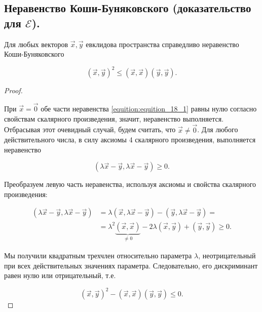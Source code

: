 \subsection{
    Неравенство Коши-Буняковского (доказательство для $\mathcal{E}$).
}


\begin{theorem}
    Для любых векторов $\vec{x}, \vec{y}$ евклидова пространства справедливо неравенство Коши-Буняковского

    \begin{equation}
        (\vec{x}, \vec{y})^2 \leq (\vec{x}, \vec{x}) (\vec{y}, \vec{y}).
        \label{equition:equition_18_1}
    \end{equation}
\end{theorem}

\begin{proof}~

    При $\vec{x} = \vec{0}$ обе части неравенства \eqref{equition:equition_18_1} равны нулю согласно свойствам скалярного произведения, значит, неравенство выполняется. Отбрасывая этот очевидный случай, будем считать, что $\vec{x} \ne \vec{0}$. Для любого действительного числа, в силу аксиомы 4 скалярного произведения, выполняется неравенство

    $$(\lambda \vec{x} - \vec{y}, \lambda \vec{x} - \vec{y}) \geq 0.$$

    Преобразуем левую часть неравенства, используя аксиомы и свойства скалярного произведения:

    \begin{align*}
        (\lambda \vec{x} - \vec{y}, \lambda \vec{x} - \vec{y}) &= \lambda (\vec{x}, \lambda \vec{x} - \vec{y}) - (\vec{y}, \lambda\vec{x} - \vec{y}) = \\
        &= \lambda^2\underbrace{(\vec{x}, \vec{x})}_{\ne 0} - 2\lambda(\vec{x}, \vec{y}) + (\vec{y}, \vec{y}) \geq 0.
    \end{align*}

    Мы получили квадратным трехчлен относительно параметра $\lambda$, неотрицательный при всех действительных значениях параметра. Следовательно, его дискриминант равен нулю или отрицательный, т.е.

    $$(\vec{x}, \vec{y})^2 - (\vec{x}, \vec{x})(\vec{y}, \vec{y}) \leq 0.$$
\end{proof}
